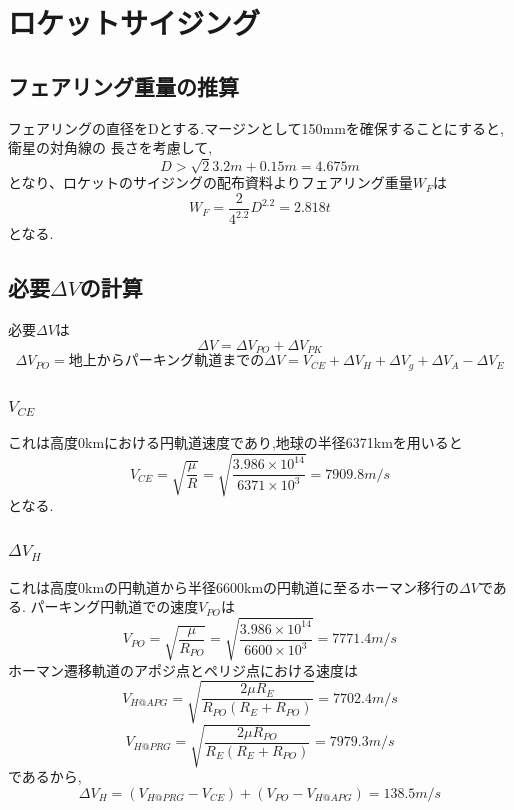 \section{ロケットサイジング}

\subsection{フェアリング重量の推算}
フェアリングの直径をDとする.マージンとして150mmを確保することにすると,衛星の対角線の
長さを考慮して,
\begin{equation}
  D > \sqrt{2}3.2m + 0.15m = 4.675m
\end{equation}
となり、ロケットのサイジングの配布資料よりフェアリング重量$W_F$は
\begin{equation}
  W_F = \frac{2}{4^{2.2}}D^{2.2} = 2.818t
\end{equation}
となる.

\subsection{必要$\Delta V$の計算}
必要$\Delta V$は
\begin{equation}
  \Delta V = \Delta V_{PO} + \Delta V_{PK}
\end{equation}
\begin{equation}
  \Delta V_{PO}= \text{地上からパーキング軌道までの$\Delta V$}
   =V_{CE} + \Delta V_H + \Delta V_g + \Delta V_A - \Delta V_E
\end{equation}
\subsubsection{$V_{CE}$}
これは高度0kmにおける円軌道速度であり,地球の半径6371kmを用いると
\begin{equation}
  V_{CE} = \sqrt{\frac{\mu}{R}}
  = \sqrt{\frac{3.986\times 10^{14}}{6371\times 10^3}}
   = 7909.8m/s
\end{equation}
となる.
\subsubsection{$\Delta V_H$}
これは高度0kmの円軌道から半径6600kmの円軌道に至るホーマン移行の$\Delta V$である.
パーキング円軌道での速度$V_{PO}$は
\begin{equation}
V_{PO} =  \sqrt{\frac{\mu}{R_{PO}}}
 = \sqrt{\frac{3.986\times 10^{14}}{6600\times 10^3}}
  = 7771.4m/s
\end{equation}
ホーマン遷移軌道のアポジ点とペリジ点における速度は
\begin{equation}
V_{H@APG} =  \sqrt{\frac{2\mu R_E}{R_{PO}(R_E+R_{PO})}}=7702.4m/s
\end{equation}
\begin{equation}
V_{H@PRG} =  \sqrt{\frac{2\mu R_{PO}}{R_E(R_E+R_{PO})}}=7979.3m/s
\end{equation}
であるから,
\begin{equation}
  \Delta V_H = (V_{H@PRG} - V_{CE}) + (V_{PO} -V_{H@APG}) =138.5m/s
\end{equation}
